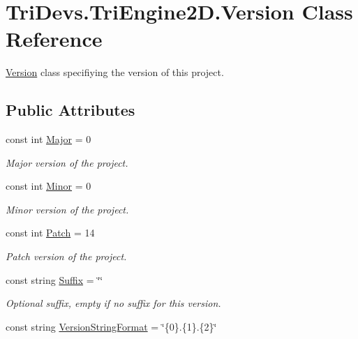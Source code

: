 \hypertarget{class_tri_devs_1_1_tri_engine2_d_1_1_version}{\section{Tri\-Devs.\-Tri\-Engine2\-D.\-Version Class Reference}
\label{class_tri_devs_1_1_tri_engine2_d_1_1_version}
}


\hyperlink{class_tri_devs_1_1_tri_engine2_d_1_1_version}{Version} class specifiying the version of this project.  


\subsection*{Public Attributes}
\begin{DoxyCompactItemize}
\item 
const int \hyperlink{class_tri_devs_1_1_tri_engine2_d_1_1_version_adf7439103e5307870f8a9b953e9f3933}{Major} = 0
\begin{DoxyCompactList}\small\item\em Major version of the project. \end{DoxyCompactList}\item 
const int \hyperlink{class_tri_devs_1_1_tri_engine2_d_1_1_version_a46c99b37d8caad10a9702e9823f6cded}{Minor} = 0
\begin{DoxyCompactList}\small\item\em Minor version of the project. \end{DoxyCompactList}\item 
const int \hyperlink{class_tri_devs_1_1_tri_engine2_d_1_1_version_a5baa982b0404ea5ed3d2526e26f55809}{Patch} = 14
\begin{DoxyCompactList}\small\item\em Patch version of the project. \end{DoxyCompactList}\item 
const string \hyperlink{class_tri_devs_1_1_tri_engine2_d_1_1_version_a5f7a61ae54163decac64e6acbe25e76d}{Suffix} = \char`\"{}\char`\"{}
\begin{DoxyCompactList}\small\item\em Optional suffix, empty if no suffix for this version. \end{DoxyCompactList}\item 
const string \hyperlink{class_tri_devs_1_1_tri_engine2_d_1_1_version_a7ff4d8681e4833ef71067425aac665e4}{Version\-String\-Format} = \char`\"{}\{0\}.\{1\}.\{2\}\char`\"{}

\end{DoxyCompactItemize}

